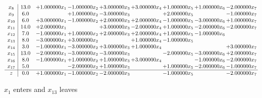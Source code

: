 \documentclass[10pt]{article}
\begin{document}
\[\begin{array}{c| c c@{\hskip 2pt} c@{\hskip 2pt} c@{\hskip 2pt} c@{\hskip 2pt} c@{\hskip 2pt} c@{\hskip 2pt} c@{\hskip 2pt} }
 x_{8}   &  13.0 & + 1.000000 x_{1} & -1.000000 x_{2} & + 3.000000 x_{3} & + 3.000000 x_{4} & + 1.000000 x_{5} & + 1.000000 x_{6} & -2.000000 x_{7}\\
 x_{9}   &  6.0  &   & + 1.000000 x_{2} & -3.000000 x_{3} &   & + 2.000000 x_{5} &   & -1.000000 x_{7}\\
 x_{10}   &  6.0 & + 3.000000 x_{1} & -1.000000 x_{2} & + 2.000000 x_{3} & + 2.000000 x_{4} & -1.000000 x_{5} & -3.000000 x_{6} & + 1.000000 x_{7}\\
 x_{11}   &  14.0 & + 2.000000 x_{1} &   & + 3.000000 x_{3} & -2.000000 x_{4} & + 1.000000 x_{5} & -2.000000 x_{6} & -2.000000 x_{7}\\
 x_{12}   &  7.0 & -1.000000 x_{1} & + 1.000000 x_{2} & + 2.000000 x_{3} & + 2.000000 x_{4} & + 1.000000 x_{5} & -1.000000 x_{6} &   \\
 x_{13}   &  8.0 & -3.000000 x_{1} & + 3.000000 x_{2} &   & + 1.000000 x_{4} & -1.000000 x_{5} &    &   \\
 x_{14}   &  3.0 & -1.000000 x_{1} & -3.000000 x_{2} & + 3.000000 x_{3} & + 1.000000 x_{4} &    &   & + 3.000000 x_{7}\\
 x_{15}   &  13.0 & -2.000000 x_{1} & -3.000000 x_{2} & -3.000000 x_{3} &   & -2.000000 x_{5} & -3.000000 x_{6} & + 2.000000 x_{7}\\
 x_{16}   &  8.0 & -1.000000 x_{1} & + 1.000000 x_{2} & + 1.000000 x_{3} & + 3.000000 x_{4} &   & -1.000000 x_{6} & -2.000000 x_{7}\\
 x_{17}   &  5.0  &   & -2.000000 x_{2} & + 1.000000 x_{3} &   & + 1.000000 x_{5} & -2.000000 x_{6} & -1.000000 x_{7}\\
\hline
z    &  0.0 & + 1.000000 x_{1} & -1.000000 x_{2} & -2.000000 x_{3} &   & -1.000000 x_{5} &   & -2.000000 x_{7}\\
\end{array}\]


 $ x_{1} $ enters and $ x_{13} $ leaves 
\end{document}

